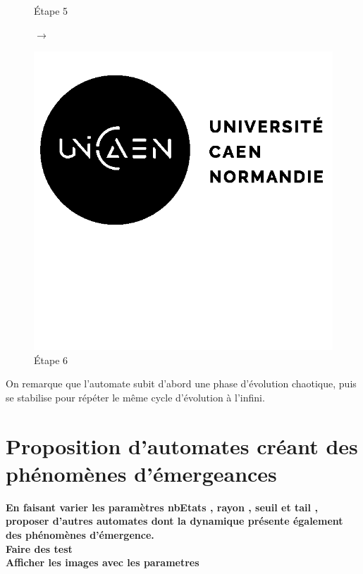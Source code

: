 \documentclass[12pt, a4paper]{article}
\begin{document}
\begin{center}
\begin{figure}[!h]
\begin{minipage}{.3\linewidth}
                    \caption{Étape 5}
                \end{minipage}
                $\rightarrow$
                \begin{minipage}{.3\linewidth}
                    \centering
                    \includegraphics[scale=0.2]{img/logo.png}
                    \caption{Étape 6}
                \end{minipage}
            \end{figure}
        \end{center}
        On remarque que l'automate subit d'abord une phase d'évolution chaotique, puis se stabilise pour répéter le même cycle d'évolution à l'infini.
    
    
    \section{Proposition d'automates créant des phénomènes d'émergeances}
        \textbf{En faisant varier les paramètres nbEtats , rayon , seuil et tail , proposer d'autres automates dont la dynamique présente également des phénomènes d'émergence.\\
        Faire des test\\
        Afficher les images avec les parametres}
    
\end{document}
